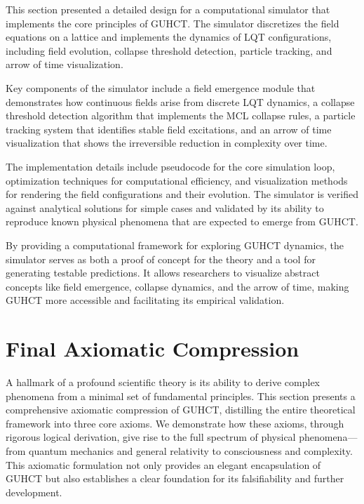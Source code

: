\documentclass[11pt,a4paper]{article}
\begin{document}
\begin{intuitivesummary}
This section presented a detailed design for a computational simulator that implements the core principles of GUHCT. The simulator discretizes the field equations on a lattice and implements the dynamics of LQT configurations, including field evolution, collapse threshold detection, particle tracking, and arrow of time visualization.

Key components of the simulator include a field emergence module that demonstrates how continuous fields arise from discrete LQT dynamics, a collapse threshold detection algorithm that implements the MCL collapse rules, a particle tracking system that identifies stable field excitations, and an arrow of time visualization that shows the irreversible reduction in complexity over time.

The implementation details include pseudocode for the core simulation loop, optimization techniques for computational efficiency, and visualization methods for rendering the field configurations and their evolution. The simulator is verified against analytical solutions for simple cases and validated by its ability to reproduce known physical phenomena that are expected to emerge from GUHCT.

By providing a computational framework for exploring GUHCT dynamics, the simulator serves as both a proof of concept for the theory and a tool for generating testable predictions. It allows researchers to visualize abstract concepts like field emergence, collapse dynamics, and the arrow of time, making GUHCT more accessible and facilitating its empirical validation.
\end{intuitivesummary}

\section{Final Axiomatic Compression}
\label{sec:axiomatic_compression}

A hallmark of a profound scientific theory is its ability to derive complex phenomena from a minimal set of fundamental principles. This section presents a comprehensive axiomatic compression of GUHCT, distilling the entire theoretical framework into three core axioms. We demonstrate how these axioms, through rigorous logical derivation, give rise to the full spectrum of physical phenomena—from quantum mechanics and general relativity to consciousness and complexity. This axiomatic formulation not only provides an elegant encapsulation of GUHCT but also establishes a clear foundation for its falsifiability and further development.
\end{document}
